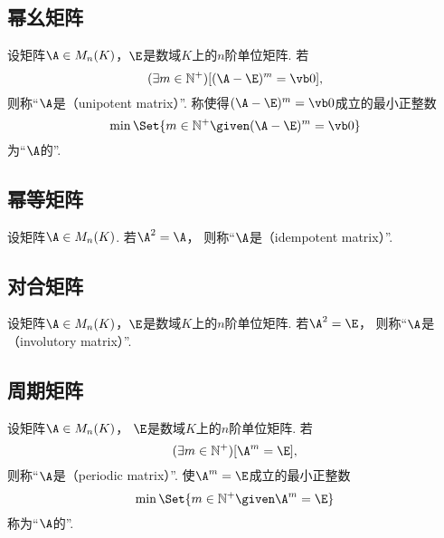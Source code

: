 \subsection{幂幺矩阵}
\begin{definition}
设矩阵\(\A \in M_n(K)\)，\(\E\)是数域\(K\)上的\(n\)阶单位矩阵.
若\[
	(\exists m\in\mathbb{N}^+)
	[(\A-\E)^m=\vb0],
\]
则称“\(\A\)是（unipotent matrix）”.
称使得\((\A-\E)^m=\vb0\)成立的最小正整数\[
    \min\Set{ m\in\mathbb{N}^+ \given (\A-\E)^m=\vb0 }
\]为“\(\A\)的”.
\end{definition}

\subsection{幂等矩阵}
\begin{definition}
设矩阵\(\A \in M_n(K)\).
若\(\A^2=\A\)，
则称“\(\A\)是（idempotent matrix）”.
\end{definition}

\subsection{对合矩阵}
\begin{definition}
设矩阵\(\A \in M_n(K)\)，\(\E\)是数域\(K\)上的\(n\)阶单位矩阵.
若\(\A^2=\E\)，
则称“\(\A\)是（involutory matrix）”.
\end{definition}

\subsection{周期矩阵}
\begin{definition}
设矩阵\(\A \in M_n(K)\)，
\(\E\)是数域\(K\)上的\(n\)阶单位矩阵.
若\[
	(\exists m\in\mathbb{N}^+)
	[\A^m = \E],
\]
则称“\(\A\)是（periodic matrix）”.
使\(\A^m = \E\)成立的最小正整数\[
	\min\Set{ m\in\mathbb{N}^+ \given \A^m = \E }
\]称为“\(\A\)的”.
\end{definition}

